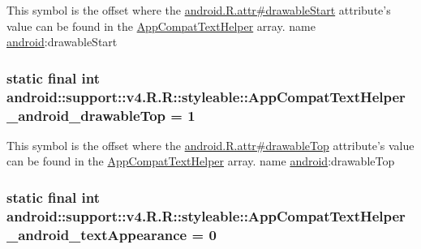 This symbol is the offset where the \hyperlink{}{android.R.attr\#drawableStart} attribute's value can be found in the \hyperlink{classandroid_1_1support_1_1v4_1_1_r_1_1styleable_4b08e16e18a4842ae56614fdc42afc26}{AppCompatTextHelper} array.  name \hyperlink{namespaceandroid}{android}:drawableStart \hypertarget{classandroid_1_1support_1_1v4_1_1_r_1_1styleable_66f496b911feca00e39235282107091b}{
\subsubsection[{AppCompatTextHelper\_\-android\_\-drawableTop}]{\setlength{\rightskip}{0pt plus 5cm}static final int android::support::v4.R.R::styleable::AppCompatTextHelper\_\-android\_\-drawableTop = 1}}
\label{classandroid_1_1support_1_1v4_1_1_r_1_1styleable_66f496b911feca00e39235282107091b}


This symbol is the offset where the \hyperlink{}{android.R.attr\#drawableTop} attribute's value can be found in the \hyperlink{classandroid_1_1support_1_1v4_1_1_r_1_1styleable_4b08e16e18a4842ae56614fdc42afc26}{AppCompatTextHelper} array.  name \hyperlink{namespaceandroid}{android}:drawableTop \hypertarget{classandroid_1_1support_1_1v4_1_1_r_1_1styleable_42af8564f82204922d5e9775f92bb815}{
\subsubsection[{AppCompatTextHelper\_\-android\_\-textAppearance}]{\setlength{\rightskip}{0pt plus 5cm}static final int android::support::v4.R.R::styleable::AppCompatTextHelper\_\-android\_\-textAppearance = 0}}
\label{classandroid_1_1support_1_1v4_1_1_r_1_1styleable_42af8564f82204922d5e9775f92bb815}



